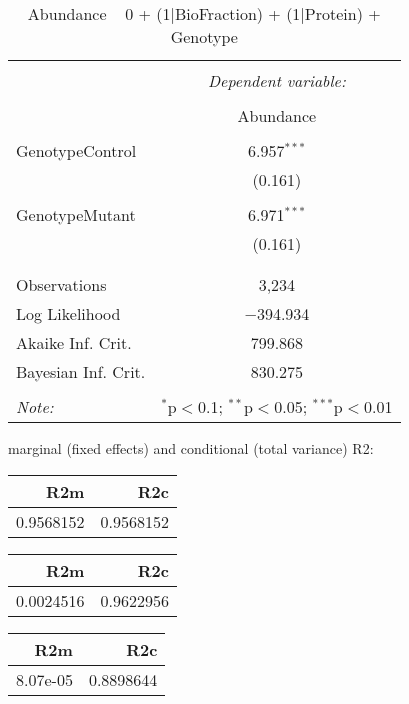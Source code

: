 \documentclass[11pt]{report}
\begin{document}
\begin{table}[!htbp] \centering 
  \caption{Abundance ~ 0 + (1|BioFraction) + (1|Protein) + Genotype} 
  \label{} 
\begin{tabular}{@{\extracolsep{5pt}}lc} 
\\[-1.8ex]\hline 
\hline \\[-1.8ex] 
 & \multicolumn{1}{c}{\textit{Dependent variable:}} \\ 
\cline{2-2} 
\\[-1.8ex] & Abundance \\ 
\hline \\[-1.8ex] 
 GenotypeControl & 6.957$^{***}$ \\ 
  & (0.161) \\ 
  & \\ 
 GenotypeMutant & 6.971$^{***}$ \\ 
  & (0.161) \\ 
  & \\ 
\hline \\[-1.8ex] 
Observations & 3,234 \\ 
Log Likelihood & $-$394.934 \\ 
Akaike Inf. Crit. & 799.868 \\ 
Bayesian Inf. Crit. & 830.275 \\ 
\hline 
\hline \\[-1.8ex] 
\textit{Note:}  & \multicolumn{1}{r}{$^{*}$p$<$0.1; $^{**}$p$<$0.05; $^{***}$p$<$0.01} \\ 
\end{tabular} 
\end{table} 
marginal (fixed effects) and conditional (total variance) R2:

\begin{tabular}{r|r}
\hline
R2m & R2c\\
\hline
0.9568152 & 0.9568152\\
\hline
\end{tabular}

\begin{tabular}{r|r}
\hline
R2m & R2c\\
\hline
0.0024516 & 0.9622956\\
\hline
\end{tabular}

\begin{tabular}{r|r}
\hline
R2m & R2c\\
\hline
8.07e-05 & 0.8898644\\
\hline
\end{tabular}
\end{document}
